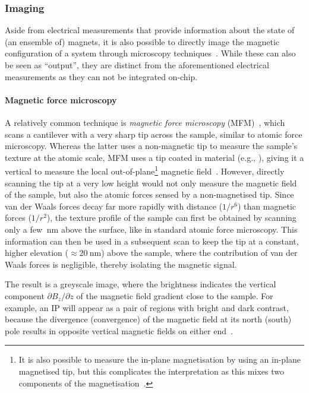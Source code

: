 \subsubsection{Imaging}
Aside from electrical measurements that provide information about the state of (an ensemble of) magnets, it is also possible to directly image the magnetic configuration of a system through microscopy techniques~\cite{freeman2001advances}.
While these can also be seen as ``output'', they are distinct from the aforementioned electrical measurements as they can not be integrated on-chip.

\paragraph{Magnetic force microscopy}
A relatively common technique is \emph{magnetic force microscopy} (MFM)~\cite{MFM}, which scans a cantilever with a very sharp tip across the sample, similar to atomic force microscopy.
Whereas the latter uses a non-magnetic tip to measure the sample's texture at the atomic scale, MFM uses a tip coated in  material (e.g., ), giving it a vertical  to measure the local out-of-plane\footnote{
	It is also possible to measure the in-plane magnetisation by using an in-plane magnetised tip, but this complicates the interpretation as this mixes two components of the magnetisation~\cite{MFM_inplane}.
} magnetic field~\cite{NML_Carlton,JM_Masterproef}.
However, directly scanning the tip at a very low height would not only measure the magnetic field of the sample, but also the atomic forces sensed by a non-magnetised tip.
Since van der Waals forces decay far more rapidly with distance ($1/r^6$) than magnetic forces ($1/r^2$), the texture profile of the sample can first be obtained by scanning only a few $\SI{}{\nano\metre}$ above the surface, like in standard atomic force microscopy.
This information can then be used in a subsequent scan to keep the tip at a constant, higher elevation ($\approx \SI{20}{\nano\metre}$) above the sample, where the contribution of van der Waals forces is negligible, thereby isolating the magnetic signal. \par
The result is a greyscale image, where the brightness indicates the vertical component $\partial B_z/ \partial z$ of the magnetic field gradient close to the sample.
For example, an IP  will appear as a pair of regions with bright and dark contrast, because the divergence (convergence) of the magnetic field at its north (south) pole results in opposite vertical magnetic fields on either end~\cite{NML_Carlton}.
